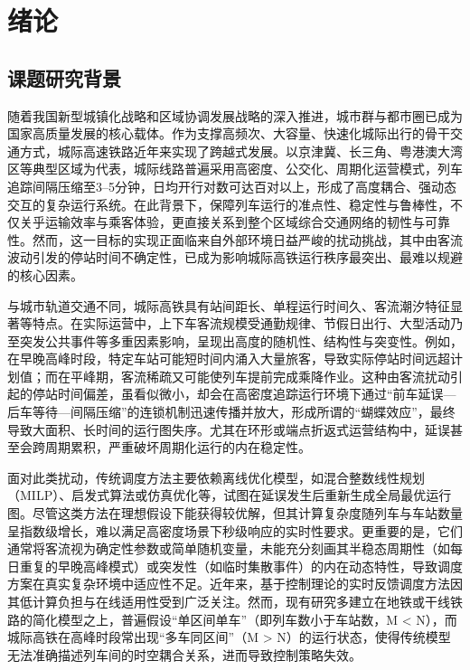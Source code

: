 \chapter{绪论}\label{chap:introduction}
\setcounter{algorithm}{0} %
\hypersetup{
    citecolor=black, %
    linkcolor=black,   %
    urlcolor=black %
}


\section{课题研究背景}
随着我国新型城镇化战略和区域协调发展战略的深入推进，城市群与都市圈已成为国家高质量发展的核心载体。作为支撑高频次、大容量、快速化城际出行的骨干交通方式，城际高速铁路近年来实现了跨越式发展。以京津冀、长三角、粤港澳大湾区等典型区域为代表，城际线路普遍采用高密度、公交化、周期化运营模式，列车追踪间隔压缩至3–5分钟，日均开行对数可达百对以上，形成了高度耦合、强动态交互的复杂运行系统。在此背景下，保障列车运行的准点性、稳定性与鲁棒性，不仅关乎运输效率与乘客体验，更直接关系到整个区域综合交通网络的韧性与可靠性。然而，这一目标的实现正面临来自外部环境日益严峻的扰动挑战，其中由客流波动引发的停站时间不确定性，已成为影响城际高铁运行秩序最突出、最难以规避的核心因素\cite{wang2021,zhang2021train,zhang2023multistage}。

与城市轨道交通不同，城际高铁具有站间距长、单程运行时间久、客流潮汐特征显著等特点。在实际运营中，上下车客流规模受通勤规律、节假日出行、大型活动乃至突发公共事件等多重因素影响，呈现出高度的随机性、结构性与突变性\cite{yu2023distributed}。例如，在早晚高峰时段，特定车站可能短时间内涌入大量旅客，导致实际停站时间远超计划值；而在平峰期，客流稀疏又可能使列车提前完成乘降作业。这种由客流扰动引起的停站时间偏差，虽看似微小，却会在高密度追踪运行环境下通过“前车延误—后车等待—间隔压缩”的连锁机制迅速传播并放大，形成所谓的“蝴蝶效应”，最终导致大面积、长时间的运行图失序。尤其在环形或端点折返式运营结构中，延误甚至会跨周期累积，严重破坏周期化运行的内在稳定性\cite{tiong2023analyzing,yun2009decision}。

面对此类扰动，传统调度方法主要依赖离线优化模型，如混合整数线性规划（MILP）、启发式算法或仿真优化等，试图在延误发生后重新生成全局最优运行图。尽管这类方法在理想假设下能获得较优解，但其计算复杂度随列车与车站数量呈指数级增长，难以满足高密度场景下秒级响应的实时性要求。更重要的是，它们通常将客流视为确定性参数或简单随机变量，未能充分刻画其半稳态周期性（如每日重复的早晚高峰模式）或突发性（如临时集散事件）的内在动态特性，导致调度方案在真实复杂环境中适应性不足。近年来，基于控制理论的实时反馈调度方法因其低计算负担与在线适用性受到广泛关注\cite{DIAS201698,Stankovic2001,Walsh2001,Stankovic1999,SHOBRYS2002149}。然而，现有研究多建立在地铁或干线铁路的简化模型之上，普遍假设“单区间单车”（即列车数小于车站数，M < N），而城际高铁在高峰时段常出现“多车同区间”（M > N）的运行状态，使得传统模型无法准确描述列车间的时空耦合关系，进而导致控制策略失效。

